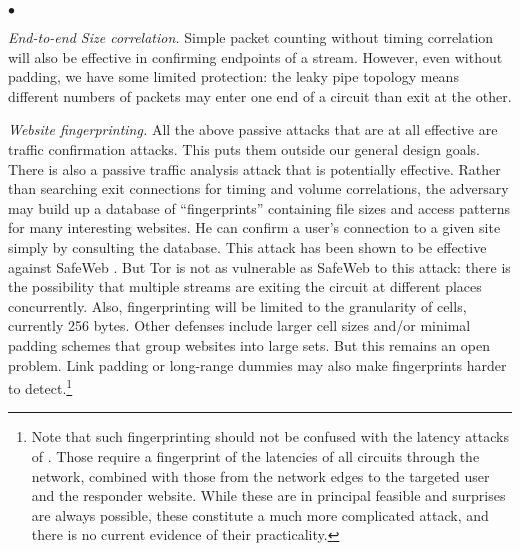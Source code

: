 \documentclass[times,10pt,twocolumn]{article}
\newenvironment{tightlist}{\begin{list}{$\bullet$}{
  \setlength{\itemsep}{0mm}
    \setlength{\parsep}{0mm}
    }}{\end{list}}
\begin{document}
\begin{tightlist}
\item \emph{End-to-end Size correlation.} Simple packet counting
  without timing correlation will also be effective in confirming
  endpoints of a stream. However, even without padding, we have some
  limited protection: the leaky pipe topology means different numbers
  of packets may enter one end of a circuit than exit at the other.
  
\item \emph{Website fingerprinting.} All the above passive
  attacks that are at all effective are traffic confirmation attacks.
  This puts them outside our general design goals. There is also
  a passive traffic analysis attack that is potentially effective.
  Rather than searching exit connections for timing and volume
  correlations, the adversary may build up a database of
  ``fingerprints'' containing file sizes and access patterns for many
  interesting websites. He can confirm a user's connection to a given
  site simply by consulting the database. This attack has
  been shown to be effective against SafeWeb \cite{hintz-pet02}. But
  Tor is not as vulnerable as SafeWeb to this attack: there is the
  possibility that multiple streams are exiting the circuit at
  different places concurrently.  Also, fingerprinting will be limited to
  the granularity of cells, currently 256 bytes. Other defenses include
  larger cell sizes and/or minimal padding schemes that group websites
  into large sets. But this remains an open problem.  Link
  padding or long-range dummies may also make fingerprints harder to
  detect.\footnote{Note that
  such fingerprinting should not be confused with the latency attacks
  of \cite{back01}. Those require a fingerprint of the latencies of
  all circuits through the network, combined with those from the
  network edges to the targeted user and the responder website. While
  these are in principal feasible and surprises are always possible,
  these constitute a much more complicated attack, and there is no
  current evidence of their practicality.}


\end{tightlist}
\end{document}
